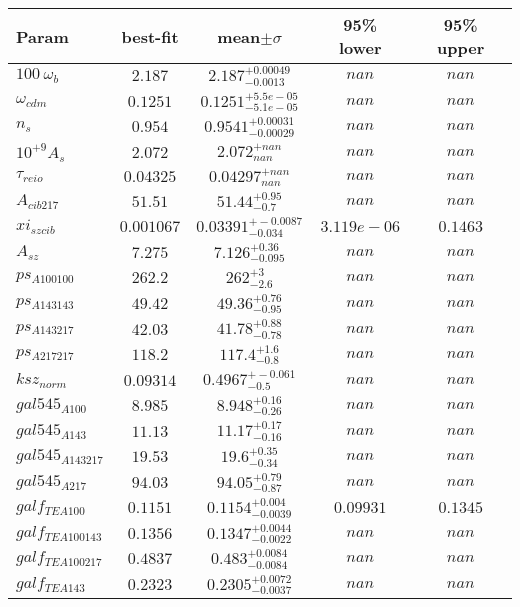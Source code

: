 \begin{tabular}{|l|c|c|c|c|} 
 \hline 
Param & best-fit & mean$\pm\sigma$ & 95\% lower & 95\% upper \\ \hline 
$100~\omega{}_{b }$ &$2.187$ & $2.187_{-0.0013}^{+0.00049}$ & $nan$ & $nan$ \\ 
$\omega{}_{cdm }$ &$0.1251$ & $0.1251_{-5.1e-05}^{+5.5e-05}$ & $nan$ & $nan$ \\ 
$n_{s }$ &$0.954$ & $0.9541_{-0.00029}^{+0.00031}$ & $nan$ & $nan$ \\ 
$10^{+9}A_{s }$ &$2.072$ & $2.072_{nan}^{+nan}$ & $nan$ & $nan$ \\ 
$\tau{}_{reio }$ &$0.04325$ & $0.04297_{nan}^{+nan}$ & $nan$ & $nan$ \\ 
$A_{cib 217 }$ &$51.51$ & $51.44_{-0.7}^{+0.95}$ & $nan$ & $nan$ \\ 
$xi_{sz cib }$ &$0.001067$ & $0.03391_{-0.034}^{+-0.0087}$ & $3.119e-06$ & $0.1463$ \\ 
$A_{sz }$ &$7.275$ & $7.126_{-0.095}^{+0.36}$ & $nan$ & $nan$ \\ 
$ps_{A 100 100 }$ &$262.2$ & $262_{-2.6}^{+3}$ & $nan$ & $nan$ \\ 
$ps_{A 143 143 }$ &$49.42$ & $49.36_{-0.95}^{+0.76}$ & $nan$ & $nan$ \\ 
$ps_{A 143 217 }$ &$42.03$ & $41.78_{-0.78}^{+0.88}$ & $nan$ & $nan$ \\ 
$ps_{A 217 217 }$ &$118.2$ & $117.4_{-0.8}^{+1.6}$ & $nan$ & $nan$ \\ 
$ksz_{norm }$ &$0.09314$ & $0.4967_{-0.5}^{+-0.061}$ & $nan$ & $nan$ \\ 
$gal545_{A 100 }$ &$8.985$ & $8.948_{-0.26}^{+0.16}$ & $nan$ & $nan$ \\ 
$gal545_{A 143 }$ &$11.13$ & $11.17_{-0.16}^{+0.17}$ & $nan$ & $nan$ \\ 
$gal545_{A 143 217 }$ &$19.53$ & $19.6_{-0.34}^{+0.35}$ & $nan$ & $nan$ \\ 
$gal545_{A 217 }$ &$94.03$ & $94.05_{-0.87}^{+0.79}$ & $nan$ & $nan$ \\ 
$galf_{TE A 100 }$ &$0.1151$ & $0.1154_{-0.0039}^{+0.004}$ & $0.09931$ & $0.1345$ \\ 
$galf_{TE A 100 143 }$ &$0.1356$ & $0.1347_{-0.0022}^{+0.0044}$ & $nan$ & $nan$ \\ 
$galf_{TE A 100 217 }$ &$0.4837$ & $0.483_{-0.0084}^{+0.0084}$ & $nan$ & $nan$ \\ 
$galf_{TE A 143 }$ &$0.2323$ & $0.2305_{-0.0037}^{+0.0072}$ & $nan$ & $nan$ \\ 

\end{tabular}
